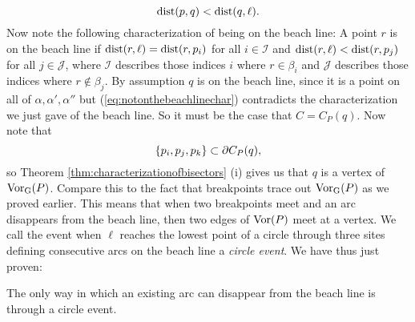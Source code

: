 \begin{equation} \label{eq:notonthebeachlinechar}
    \operatorname{dist}(p, q) < \operatorname{dist}(q, \ell).
\end{equation}
Now note the following characterization of being on the beach line: A point $r$ is on the beach line if $\operatorname{dist}(r, \ell) = \operatorname{dist}(r, p_i)$ for all $i \in \mathcal{I}$ and $\operatorname{dist}(r, \ell) < \operatorname{dist}(r, p_j)$ for all $j \in \mathcal{J}$, where $\mathcal{I}$ describes those indices $i$ where $r \in \beta_i$ and $\mathcal{J}$ describes those indices where $r \not\in \beta_j$. By assumption $q$ is on the beach line, since it is a point on all of $\alpha, \alpha', \alpha''$ but (\ref{eq:notonthebeachlinechar}) contradicts the characterization we just gave of the beach line. So it must be the case that $C = C_P(q)$. Now note that
\[
    \{p_i, p_j, p_k\} \subset \partial C_P(q),
\]
so Theorem \ref{thm:characterizationofbisectors} (i) gives us that $q$ is a vertex of $\operatorname{Vor_{G}}(P)$. Compare this to the fact that breakpoints trace out $\operatorname{Vor_{G}}(P)$ as we proved earlier. This means that when two breakpoints meet and an arc disappears from the beach line, then two edges of $\operatorname{Vor}(P)$ meet at a vertex. We call the event when $\ell$ reaches the lowest point of a circle through three sites defining consecutive arcs on the beach line a \emph{circle event}. We have thus just proven:
\begin{lem}
The only way in which an existing arc can disappear from the beach line is through a circle event.
\end{lem}

